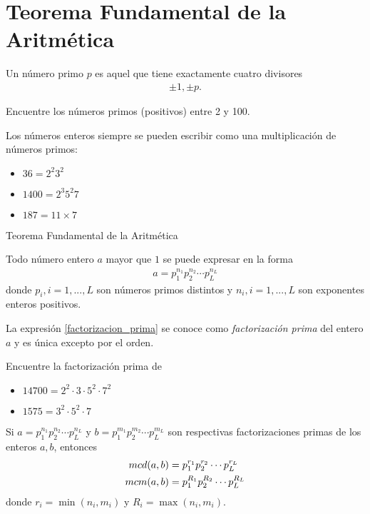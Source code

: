 \section{Teorema Fundamental de la Aritmética}

{}
Un número primo $p$ es aquel que tiene exactamente cuatro divisores
\begin{align*}
\pm 1, \pm p.
\end{align*}


{}
\begin{problema}
Encuentre los números primos (positivos) entre 2 y 100.
\end{problema}


{}
Los números enteros siempre se pueden escribir como una multiplicación de números primos:
\begin{itemize}
\item $36=2^{2}3^{2}$
\item $1400=2^{3}5^{2}7$
\item $187=11\times 7$
\end{itemize}


{Teorema Fundamental de la Aritmética}
\begin{thm}
	Todo número entero $a$ mayor que $1$ se puede expresar en la forma
	\begin{align}
		\label{factorizacion_prima}
		\tag{FP}
		a=p_{1}^{n_{1}}p_{2}^{n_{2}}\cdots p_{L}^{n_{L}}
	\end{align}
	donde $p_{i}, i=1,...,L$ son números primos distintos y $n_{i}, i=1,...,L$ son exponentes enteros positivos. 
\end{thm}

\begin{rem}
	La expresión \ref{factorizacion_prima} se conoce como \emph{factorización prima} del entero $a$ y es única excepto por el orden.
\end{rem}

{}
Encuentre la factorización prima de 
\begin{itemize}
\item $14700 = 2^{2}\cdot 3 \cdot 5^{2} \cdot 7^{2}$
\item $1575 = 3^{2}\cdot 5^{2} \cdot 7$
\end{itemize}


{}
\begin{prop}
	Si $a=p_{1}^{n_{1}}p_{2}^{n_{2}}\cdots p_{L}^{n_{L}}$ y $b=p_{1}^{m_{1}}p_{2}^{m_{2}}\cdots p_{L}^{m_{L}}$ son respectivas factorizaciones primas de los enteros $a,b$, entonces
	\begin{align*}
		mcd(a,b) &= p_{1}^{r_{1}}p_{2}^{r_{2}}\cdots p_{L}^{r_{L}}\\
		mcm(a,b) &= p_{1}^{R_{1}}p_{2}^{R_{2}}\cdots p_{L}^{R_{L}}
\end{align*}
donde $r_{i}=\min(n_{i},m_{i})$ y $R_{i}=\max(n_{i},m_{i}).$
\end{prop}


